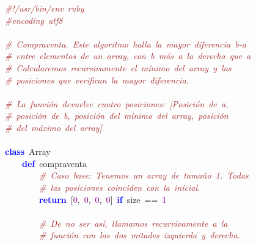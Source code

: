 \noindent
\mbox{}\textit{\textcolor{Brown}{\#!/usr/bin/env\ ruby}} \\
\mbox{}\textit{\textcolor{Brown}{\#encoding\ utf8}} \\
\mbox{} \\
\mbox{}\textit{\textcolor{Brown}{\#\ Compraventa.\ Este\ algoritmo\ halla\ la\ mayor\ diferencia\ b-a}} \\
\mbox{}\textit{\textcolor{Brown}{\#\ entre\ elementos\ de\ un\ array,\ con\ b\ más\ a\ la\ derecha\ que\ a\ }} \\
\mbox{}\textit{\textcolor{Brown}{\#\ Calcularemos\ recursivamente\ el\ mínimo\ del\ array\ y\ las}} \\
\mbox{}\textit{\textcolor{Brown}{\#\ posiciones\ que\ verifican\ la\ mayor\ diferencia.\ }} \\
\mbox{} \\
\mbox{}\textit{\textcolor{Brown}{\#\ La\ función\ devuelve\ cuatro\ posiciones:\ [Posición\ de\ a,}} \\
\mbox{}\textit{\textcolor{Brown}{\#\ posición\ de\ b,\ posición\ del\ mínimo\ del\ array,\ posición}} \\
\mbox{}\textit{\textcolor{Brown}{\#\ del\ máximo\ del\ array]}} \\
\mbox{} \\
\mbox{}\textbf{\textcolor{Blue}{class}}\ Array \\
\mbox{}\ \ \ \ \textbf{\textcolor{Blue}{def}}\ compraventa \\
\mbox{}\ \ \ \ \ \ \ \ \textit{\textcolor{Brown}{\#\ Caso\ base:\ Tenemos\ un\ array\ de\ tamaño\ 1.\ Todas\ }} \\
\mbox{}\ \ \ \ \ \ \ \ \textit{\textcolor{Brown}{\#\ las\ posiciones\ coinciden\ con\ la\ inicial.\ }} \\
\mbox{}\ \ \ \ \ \ \ \ \textbf{\textcolor{Blue}{return}}\ \textcolor{BrickRed}{[}\textcolor{Purple}{0}\textcolor{BrickRed}{,}\ \textcolor{Purple}{0}\textcolor{BrickRed}{,}\ \textcolor{Purple}{0}\textcolor{BrickRed}{,}\ \textcolor{Purple}{0}\textcolor{BrickRed}{]}\ \textbf{\textcolor{Blue}{if}}\ size\ \textcolor{BrickRed}{==}\ \textcolor{Purple}{1}\ \ \ \ \ \ \ \ \ \ \ \ \  \\
\mbox{} \\
\mbox{}\ \ \ \ \ \ \ \ \textit{\textcolor{Brown}{\#\ De\ no\ ser\ así,\ llamamos\ recurvivamente\ a\ la\ }} \\
\mbox{}\ \ \ \ \ \ \ \ \textit{\textcolor{Brown}{\#\ función\ con\ las\ dos\ mitades\ izquierda\ y\ derecha.\ \ \ \ \ }} \\

